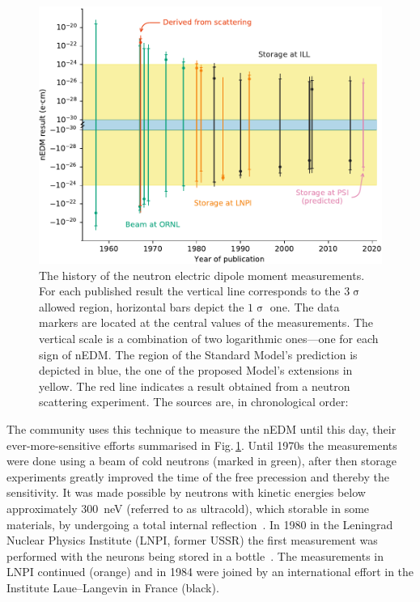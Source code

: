\begin{figure}
  \centering
  \includegraphics[width=\linewidth]{gfx/introduction/edm_limits.pdf}
  \caption{The history of the neutron electric dipole moment measurements. For each published result the vertical line corresponds to the $3\upsigma$ allowed region, horizontal bars depict the $1\upsigma$ one. The data markers are located at the central values of the measurements. The vertical scale is a combination of two logarithmic ones---one for each sign of nEDM\@. The region of the Standard Model's prediction is depicted in blue, the one of the proposed Model's extensions in yellow. The red line indicates a result obtained from a neutron scattering experiment. The sources are, in chronological order:~\cite{PhysRev.108.120,PhysRevLett.19.381,PhysRevLett.19.384,PhysRev.170.1200,PhysRev.179.1285,PhysRevD.7.3147,PhysRevD.15.9,ALTAREV1980269,ALTAREV198113,altarev1986search,ALTAREV1992242,PENDLEBURY1984327,SMITH1990191,PhysRevLett.82.904,PhysRevLett.97.131801,Pendlebury2015}}\label{fig:nEDM_limits_history}
\end{figure}

The community uses this technique to measure the nEDM until this day, their ever-more-sensitive efforts summarised in Fig.\,\ref{fig:nEDM_limits_history}. Until 1970s the measurements were done using a beam of cold neutrons (marked in green), after then storage experiments greatly improved the time of the free precession and thereby the sensitivity. It was made possible by neutrons with kinetic energies below approximately \SI{300}{\nano\electronvolt} (referred to as ultracold), which storable in some materials, by undergoing a total internal reflection~\cite{UCNbook}. In 1980 in the Leningrad Nuclear Physics Institute (LNPI, former USSR) the first measurement was performed with the neurons being stored in a bottle~\cite{ALTAREV1980269}. The measurements in LNPI continued (orange) and in 1984 were joined by an international effort in the Institute Laue--Langevin in France (black).

